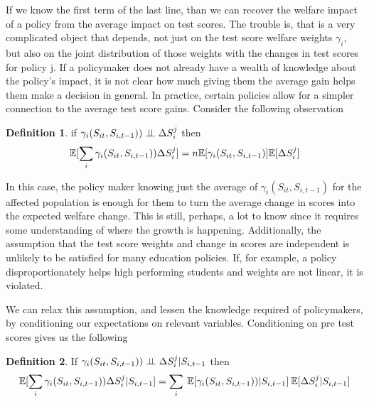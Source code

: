 \documentclass{article}
\theoremstyle{definition}
\theoremstyle{definition}
\theoremstyle{definition}
\theoremstyle{definition}
\newtheorem{definition}{Definition}
\begin{document}
    If we know the first term of the last line, than we can recover the welfare impact of a policy from the average impact on test scores. The trouble is, that is a very complicated object that depends, not just on the test score welfare weights $\gamma_i$, but also on the joint distribution of those weights with the changes in test scores for policy j. If a policymaker does not already have a wealth of knowledge about the policy's impact, it is not clear how much giving them the average gain helps them make a decision in general. In practice, certain policies allow for a simpler connection to the average test score gains. Consider the following observation 
    
    \large
    \begin{definition}
    \label{pol_indep}
    if $\gamma_i(S_{it}, S_{i,t-1})) \perp \!\!\! \perp \Delta S_i^j$ then 
    \begin{equation}
        \mathbb{E}[\sum_i \gamma_i(S_{it}, S_{i,t-1})) \Delta S_i^j]= n\mathbb{E}[\gamma_i(S_{it}, S_{i,t-1})]\mathbb{E}[\Delta S_i^j]
    \end{equation}
    \end{definition}
    
    \normalsize
    In this case, the policy maker knowing just the average of $\gamma_i(S_{it}, S_{i,t-1})$ for the affected population is enough for them to turn the average change in scores into the expected welfare change. This is still, perhaps, a lot to know since it requires some understanding of where the growth is happening. Additionally, the assumption that the test score weights and change in scores are independent is unlikely to be satisfied for many education policies. If, for example, a policy disproportionately helps high performing students and weights are not linear, it is violated.
    
    We can relax this assumption, and lessen the knowledge required of policymakers, by conditioning our expectations on relevant variables. Conditioning on pre test scores gives us the following 
    
    \large
    \begin{definition}
    \label{cond_exp_1}
        If $ \gamma_i(S_{it}, S_{i,t-1})) \perp \!\!\! \perp \Delta S_i^j | S_{i,t-1}$ then
        \begin{equation*}
           \mathbb{E}[\sum_i \gamma_i(S_{it}, S_{i,t-1})) \Delta S_i^j| S_{i,t-1}]= \sum_i \: \mathbb{E}[\gamma_i(S_{it}, S_{i,t-1}))|S_{i,t-1}] \:\mathbb{E}[\Delta S_i^j|S_{i,t-1}] 
        \end{equation*}
    \end{definition}
    \normalsize
    
\end{document}
